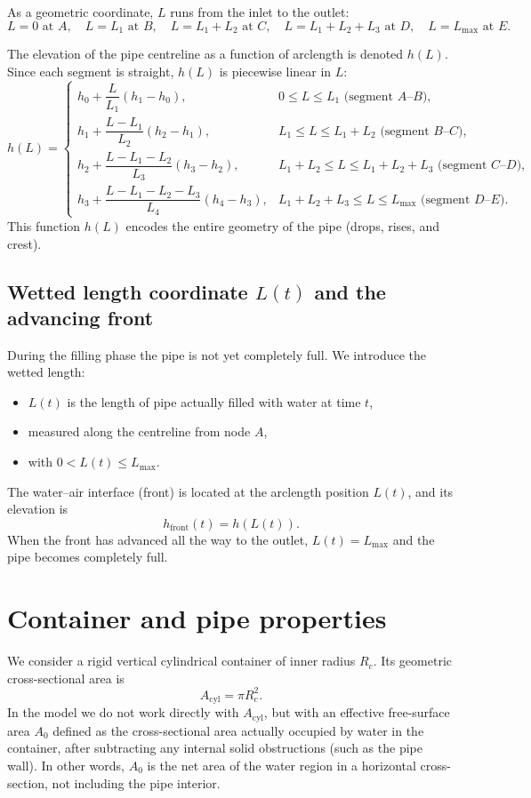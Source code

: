 \documentclass[11pt]{article}
\begin{document}
As a geometric coordinate, $L$ runs from the inlet to the outlet:
\[
  L = 0 \text{ at } A,\quad
  L = L_1 \text{ at } B,\quad
  L = L_1 + L_2 \text{ at } C,\quad
  L = L_1 + L_2 + L_3 \text{ at } D,\quad
  L = L_{\max} \text{ at } E.
\]

The elevation of the pipe centreline as a function of arclength is denoted $h(L)$. Since
each segment is straight, $h(L)$ is piecewise linear in $L$:
\[
h(L) = \begin{cases}
  h_0 + \dfrac{L}{L_1}(h_1 - h_0), & 0 \le L \le L_1 \text{ (segment $A$--$B$)}, \\[1em]
  h_1 + \dfrac{L - L_1}{L_2}(h_2 - h_1), & L_1 \le L \le L_1 + L_2 \text{ (segment $B$--$C$)}, \\[1em]
  h_2 + \dfrac{L - L_1 - L_2}{L_3}(h_3 - h_2), & L_1 + L_2 \le L \le L_1 + L_2 + L_3 \text{ (segment $C$--$D$)}, \\[1em]
  h_3 + \dfrac{L - L_1 - L_2 - L_3}{L_4}(h_4 - h_3), & L_1 + L_2 + L_3 \le L \le L_{\max} \text{ (segment $D$--$E$)}.
\end{cases}
\]
This function $h(L)$ encodes the entire geometry of the pipe (drops, rises, and crest).

\subsection{Wetted length coordinate $L(t)$ and the advancing front}

During the filling phase the pipe is not yet completely full. We introduce the wetted length:
\begin{itemize}
  \item $L(t)$ is the length of pipe actually filled with water at time $t$,
  \item measured along the centreline from node $A$,
  \item with $0 < L(t) \le L_{\max}$.
\end{itemize}
The water--air interface (front) is located at the arclength position $L(t)$, and its elevation is
\[
  h_{\text{front}}(t) = h(L(t)).
\]
When the front has advanced all the way to the outlet, $L(t) = L_{\max}$ and the pipe becomes
completely full.

\section{Container and pipe properties}
\label{sec:container}

We consider a rigid vertical cylindrical container of inner radius $R_c$. Its geometric
cross-sectional area is
\[
  A_{\text{cyl}} = \pi R_c^2.
\]
In the model we do not work directly with $A_{\text{cyl}}$, but with an effective free-surface
area $A_0$ defined as the cross-sectional area actually occupied by water in the container,
after subtracting any internal solid obstructions (such as the pipe wall). In other words,
$A_0$ is the net area of the water region in a horizontal cross-section, not including the
pipe interior.
\end{document}
